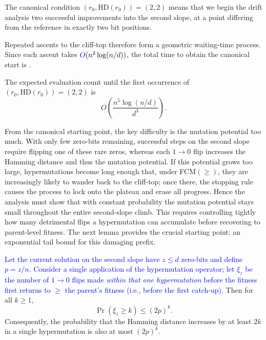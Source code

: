 The canonical condition $(r_0,\mathrm{HD}(r_0)) =
(2,2)$ means that we begin the drift analysis two successful improvements into
the second slope, at a point differing from the reference in exactly two
bit positions.

Repeated ascents to the cliff-top therefore form a geometric waiting-time 
process.    Since each ascent takes $\textcolor{blue}{O}(n^2\log(n/d))$, the 
total time to obtain the canonical start is .

\begin{corollary}
	The expected evaluation count until the first occurrence of 
	$(r_0,\mathrm{HD}(r_0)) = (2,2)$ is 
	\[
	O\!\left(\frac{n^{5}\log(n/d)}{d^{3}}\right).
	\]
\end{corollary}


From the canonical starting point, the key difficulty is  the mutation
potential  too much.  With only few zero-bits remaining, successful
steps on the second slope require flipping one of these rare zeros, whereas each
$1\!\to0$ flip increases the Hamming distance and thus the mutation potential.
If this potential grows too large, hypermutations become long enough that, under
FCM$(\ge)$, they are increasingly likely to wander back to the cliff-top; once
there, the stopping rule causes the process to lock onto the plateau and erase
all progress.  Hence the analysis must show that with constant probability the
mutation potential stays small throughout the entire second-slope climb.  This
requires  controlling tightly how many detrimental flips a hypermutation can
accumulate before recovering to parent-level fitness.  The next lemma provides
the crucial starting point: an exponential tail bound for this damaging prefix.

\begin{lemma}%
	 \label{lem:xi-tail}
	\textcolor{blue}{Let the current solution on the second slope have $z\le d$ zero-bits and
	define $p=z/n$.
	Consider a single application of the hypermutation operator; let $\xi_z$ be
	the number of $1\to0$ flips made \emph{within that one hypermutation} before
	the fitness first returns to $\ge$ the parent's fitness (i.e., before the
	first catch-up).}
	Then for all $k\ge1$,
	\[
	\Pr(\xi_z\ge k)\le (2p)^k.
	\]
	Consequently, the probability that the Hamming distance increases by at least 
	$2k$ in a single hypermutation is also at most $(2p)^k$.
\end{lemma}

